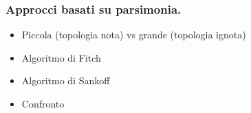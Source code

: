 \begin{comment}
  \begin{column}{0.42\textwidth}
  \resizebox{\textwidth}{!}{
  \begin{tikzpicture}[>=triangle 60]
    \mut{(3,9.5)}{N};
    \muta{(3,7)}{s4};
    \mutb{(5,0.5)}{s1};
    \mutc{(0,5)}{s3};
\mutd{(-2,2.8)}{s6};
\mute{(-3,0.5)}{s2};
\mutf{(-1,0.5)}{s5};
\mutc{(1,0.5)}{s32};
\muta{(3,0.5)}{s42};
\draw[thick,->,>=stealth] (N) to node[midway, right=5pt,circle, fill, scale=.6] (e1){} node[right=10pt]{}(s4) ;
\draw[thick,->,>=stealth] (s4) to node[near start,right=5pt,fill,color=brown,star, star points=7,scale=0.6]  {}node[right=10pt,near start]{} (s1) ;
\draw[thick,->,>=stealth] (s4) to node[near start,left=5pt,fill,color=green,regular polygon, regular polygon sides=3,scale=0.45]  {} node[left=10pt,near start]{} (s3) ;
\draw[thick,->,>=stealth] (s3) to node[near start,left=5pt,fill,color=red,regular polygon, regular polygon sides=4,scale=0.7]  {} node[left=10pt,near start]{} (s6) ;
\draw[thick,->,>=stealth] (s6) to node[near start,left=5pt,draw,cross out, pink, very thick,scale=.7]  {} node[left=10pt,near start]{} (s2) ;
\draw[thick,->,>=stealth] (s6) to node[near start,right=5pt,fill,diamond,scale=0.5, fill,color=blue]  {} node[right=10pt,near start]{} (s5) ;
\draw[thick,->,>=stealth] (s3) -- (s32) ;
\draw[thick,->,>=stealth] (s4) to   (s42) ;

\draw (-4,-1) rectangle node[pos=.18] {Sample 1}(1.9,1.5);
\draw[dashed] (6,-1.5) rectangle node[yellow, pos=.2] {Sample 2}(0.0,2);
  \end{tikzpicture}
}
\end{column}
\end{columns}
\end{frame}
\end{comment}

\begin{frame}[fragile]
\frametitle{Approcci basati su parsimonia.}
\begin{itemize}
\item
Piccola (topologia nota) vs grande (topologia ignota)
\item
Algoritmo di Fitch
\item
Algoritmo di Sankoff
\item
Confronto
\end{itemize}
\end{frame}

